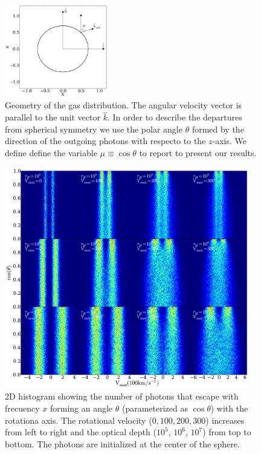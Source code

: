 \documentclass{emulateapj}
\newcommand{\ly}{{\ifmmode{{\rm Ly}\alpha~}\else{Ly$\alpha$~}\fi}}
\newcommand{\kms}{{\ifmmode{{\mathrm{\,km\ s}^{-1}}}\else{\,km~s$^{-1}$}\fi}}
\begin{document}
\begin{figure}
\begin{center}
  \includegraphics[width=0.4\textwidth]{f1.pdf}
\end{center}
\caption{Geometry of the gas distribution. The angular velocity vector
  is parallel to the unit vector $\hat{k}$. In order to describe the
  departures from spherical symmetry we use the polar angle $\theta$
  formed by the direction of the outgoing photons with respecto to the
  $z$-axis. We define define the variable $\mu\equiv\cos\theta$ to
  report to present our results.
    \label{fig:geometry}}  
\end{figure}



\begin{figure}
\begin{center}
  \includegraphics[width=0.95\textwidth]{f2.pdf}
\end{center}
\caption{
2D histogram showing the number of photons that escape with frecuency
$x$ forming an angle $\theta$ (parameterized as $\cos\theta$) with the
rotationa axis. The rotational velocity ($0,100,200,300$\kms)
increases from left to right and the optical depth ($10^5$, $10^6$,
$10^7$) from top to bottom. The \ly photons are initialized at the
center of the sphere.
\label{fig:CentralSpec} }   
\end{figure}
\end{document}
